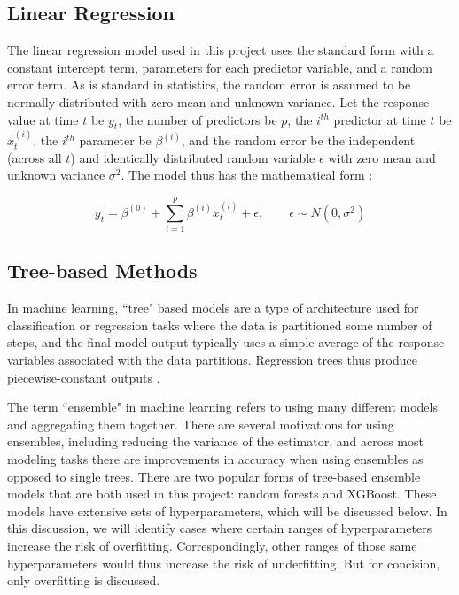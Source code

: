 
\subsection{Linear Regression}

The linear regression model used in this project uses the standard form with a constant intercept term, parameters for each predictor variable, and a random error term. As is standard in statistics, the random error is assumed to be normally distributed with zero mean and unknown variance. Let the response value at time $t$ be $y_t$, the number of predictors be $p$, the $i^{th}$ predictor at time $t$ be $x^{(i)}_t$, the $i^{th}$ parameter be $\beta^{(i)}$, and the random error be the  independent (across all $t$) and identically distributed random variable $\epsilon$ with zero mean and unknown variance $\sigma^2$. The model thus has the mathematical form \citep[e.g.][p.\ 44]{Hastie-2010-ESL}:

\[
y_t = \beta^{(0)} + \sum_{i=1}^p \beta^{(i)} x^{(i)}_t + \epsilon, \qquad \epsilon\sim N(0, \sigma^2)
\]

\subsection{Tree-based Methods}

In machine learning, ``tree" based models are a type of architecture used for classification or regression tasks where the data is partitioned some number of steps, and the final model output typically uses a simple average of the response variables associated with the data partitions. Regression trees thus produce piecewise-constant outputs \citep[Chap.\ 10]{Hastie-2010-ESL}.

The term ``ensemble" in machine learning refers to using many different models and aggregating them together. There are several motivations for using ensembles, including reducing the variance of the estimator, and across most modeling tasks there are improvements in accuracy when using ensembles as opposed to single trees. There are two popular forms of tree-based ensemble models that are both used in this project: random forests and XGBoost. These models have extensive sets of hyperparameters, which will be discussed below. In this discussion, we will identify cases where certain ranges of hyperparameters increase the risk of overfitting. Correspondingly, other ranges of those same hyperparameters would thus increase the risk of underfitting. But for concision, only overfitting is discussed.

